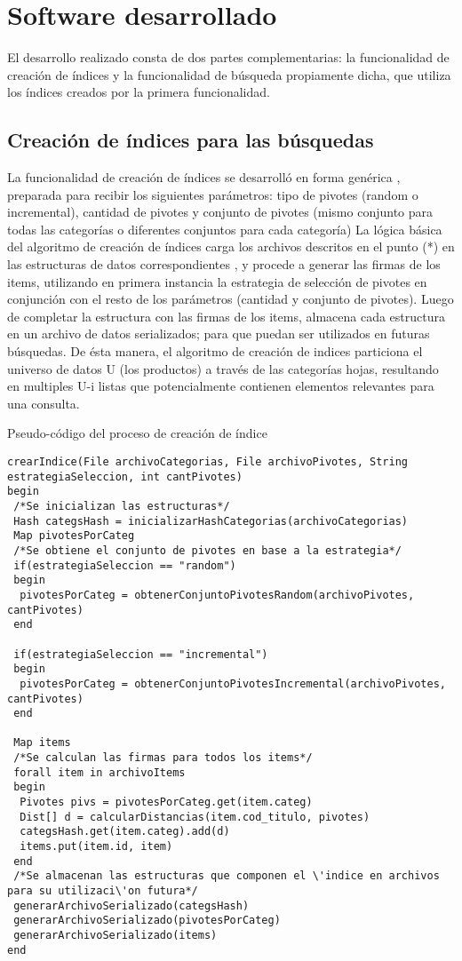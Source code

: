 \section{Software desarrollado}
El desarrollo realizado consta de dos partes complementarias: la funcionalidad 
de creaci\'on de \'indices y la funcionalidad de b\'usqueda propiamente dicha, 
que utiliza los \'indices creados por la primera funcionalidad.

\subsection{Creaci\'on de \'indices para las b\'usquedas}
La funcionalidad de creaci\'on de \'indices se desarroll\'o en forma gen\'erica
, preparada para recibir los siguientes par\'ametros: tipo de pivotes (random o
 incremental), cantidad de pivotes y conjunto de pivotes (mismo conjunto para 
 todas las categor\'ias o diferentes conjuntos para cada categor\'ia)
La l\'ogica b\'asica del algoritmo de creaci\'on de \'indices carga los 
archivos descritos en el punto (*) en las estructuras de datos correspondientes
, y procede a generar las firmas de los items, utilizando en primera instancia 
la estrategia de selecci\'on de pivotes en conjunci\'on con el resto de los 
par\'ametros (cantidad y conjunto de pivotes). Luego de completar la estructura
 con las firmas de los items, almacena cada estructura en un archivo de datos 
 serializados; para que puedan ser utilizados en futuras b\'usquedas.
De \'esta manera, el algoritmo de creaci\'on de indices particiona el universo 
de datos U (los productos) a trav\'es de las categor\'ias hojas, resultando en 
multiples U-i listas que potencialmente contienen elementos relevantes para una
 consulta.

Pseudo-código del proceso de creación de índice 
\begin{lstlisting}
crearIndice(File archivoCategorias, File archivoPivotes, String estrategiaSeleccion, int cantPivotes)
begin
 /*Se inicializan las estructuras*/
 Hash categsHash = inicializarHashCategorias(archivoCategorias)
 Map pivotesPorCateg
 /*Se obtiene el conjunto de pivotes en base a la estrategia*/
 if(estrategiaSeleccion == "random")
 begin
  pivotesPorCateg = obtenerConjuntoPivotesRandom(archivoPivotes, cantPivotes)
 end

 if(estrategiaSeleccion == "incremental")
 begin
  pivotesPorCateg = obtenerConjuntoPivotesIncremental(archivoPivotes, cantPivotes)
 end

 Map items
 /*Se calculan las firmas para todos los items*/
 forall item in archivoItems
 begin
  Pivotes pivs = pivotesPorCateg.get(item.categ)
  Dist[] d = calcularDistancias(item.cod_titulo, pivotes)
  categsHash.get(item.categ).add(d)
  items.put(item.id, item)
 end
 /*Se almacenan las estructuras que componen el \'indice en archivos para su utilizaci\'on futura*/
 generarArchivoSerializado(categsHash)
 generarArchivoSerializado(pivotesPorCateg)
 generarArchivoSerializado(items)
end
\end{lstlisting}

